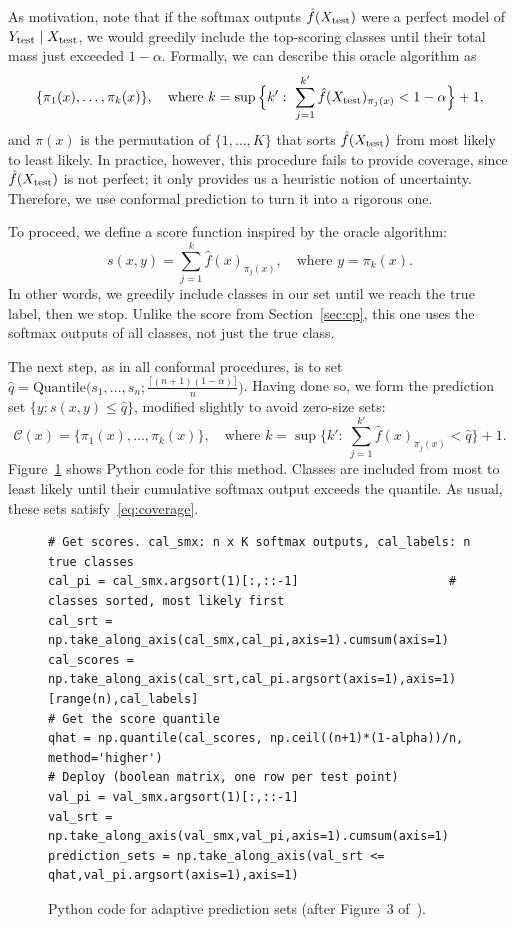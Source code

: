 \documentclass[11pt]{article}
\theoremstyle{definition}
\newcommand{\C}{\mathcal{C}}
\newcommand{\fhat}{\hat{f}}
\newcommand{\qhat}{\hat{q}}
\newcommand{\Xtest}{X_{\rm test}}
\newcommand{\Ytest}{Y_{\rm test}}
\begin{document}
As motivation, note that if the softmax outputs $\fhat(\Xtest)$ were a perfect model of $\Ytest\mid\Xtest$, we would greedily include the top-scoring classes until their total mass just exceeded $1-\alpha$. Formally, we can describe this oracle algorithm as
\[\{\pi_1(x),\dots,\pi_k(x)\},\quad\text{where }k=\sup\Big\{k':\ \sum_{j=1}^{k'}\fhat(\Xtest)_{\pi_j(x)}<1-\alpha\Big\}+1,\]
and $\pi(x)$ is the permutation of $\{1,\dots,K\}$ that sorts $\fhat(\Xtest)$ from most likely to least likely. In practice, however, this procedure fails to provide coverage, since $\fhat(\Xtest)$ is not perfect; it only provides us a heuristic notion of uncertainty. Therefore, we use conformal prediction to turn it into a rigorous one.

To proceed, we define a score function inspired by the oracle algorithm:
\begin{equation}\label{eq:aps-score}
s(x,y)=\sum_{j=1}^{k}\fhat(x)_{\pi_j(x)},\quad\text{where }y=\pi_k(x).
\end{equation}
In other words, we greedily include classes in our set until we reach the true label, then we stop. Unlike the score from Section~\ref{sec:cp}, this one uses the softmax outputs of all classes, not just the true class.

The next step, as in all conformal procedures, is to set $\qhat=\mathrm{Quantile}\big(s_1,\dots,s_n;\frac{\lceil(n+1)(1-\alpha)\rceil}{n}\big)$. Having done so, we form the prediction set $\{y:s(x,y)\le\qhat\}$, modified slightly to avoid zero-size sets:
\begin{equation}\label{eq:aps-set}
\C(x)=\{\pi_1(x),\dots,\pi_k(x)\},\quad\text{where }k=\sup\Big\{k':\ \sum_{j=1}^{k'}\fhat(x)_{\pi_j(x)}<\qhat\Big\}+1.
\end{equation}
Figure~\ref{fig:code-aps} shows Python code for this method. Classes are included from most to least likely until their cumulative softmax output exceeds the quantile. As usual, these sets satisfy~\eqref{eq:coverage}.

\begin{figure}[H]
\begin{snugshade}
\begin{Verbatim}
# Get scores. cal_smx: n x K softmax outputs, cal_labels: n true classes
cal_pi = cal_smx.argsort(1)[:,::-1]                     # classes sorted, most likely first
cal_srt = np.take_along_axis(cal_smx,cal_pi,axis=1).cumsum(axis=1)
cal_scores = np.take_along_axis(cal_srt,cal_pi.argsort(axis=1),axis=1)[range(n),cal_labels]
# Get the score quantile
qhat = np.quantile(cal_scores, np.ceil((n+1)*(1-alpha))/n, method='higher')
# Deploy (boolean matrix, one row per test point)
val_pi = val_smx.argsort(1)[:,::-1]
val_srt = np.take_along_axis(val_smx,val_pi,axis=1).cumsum(axis=1)
prediction_sets = np.take_along_axis(val_srt <= qhat,val_pi.argsort(axis=1),axis=1)
\end{Verbatim}
\end{snugshade}
\caption{Python code for adaptive prediction sets (after Figure~3 of~\cite{gentle}).}
\label{fig:code-aps}
\end{figure}
\end{document}

